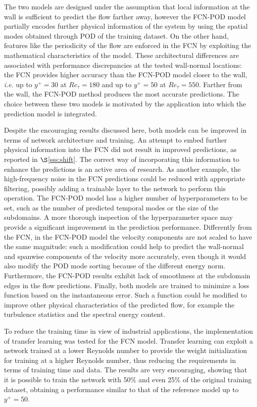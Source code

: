 The two models are designed under the assumption that local information at the wall is sufficient to predict the flow farther away, however the FCN-POD model partially encodes further physical information of the system by using the spatial modes obtained through POD of the training dataset.
On the other hand, features like the periodicity of the flow are enforced in the FCN by exploiting the mathematical characteristics of the model.
These architectural differences are associated with performance discrepancies at the tested wall-normal locations: the FCN provides higher accuracy than the FCN-POD model closer to the wall, {\it i.e.} up to $y^+=30$ at $Re_{\tau} = 180$ and up to $y^+=50$ at $Re_{\tau} = 550$.
Farther from the wall, the FCN-POD method produces the most accurate predictions.
The choice between these two models is motivated by the application into which the prediction model is integrated.

Despite the encouraging results discussed here, both models can be improved in terms of network architecture and training.
An attempt to embed further physical information into the FCN did not result in improved predictions, as reported in $\S$\ref{sss:shift}.
The correct way of incorporating this information to enhance the predictions is an active area of research. As another example, the high-frequency noise in the FCN predictions could be reduced with appropriate filtering, possibly adding a trainable layer to the network to perform this operation.
The FCN-POD model has a higher number of hyperparameters to be set, such as the number of predicted temporal modes or the size of the subdomains.
A more thorough inspection of the hyperparameter space may provide a significant improvement in the prediction performance.
Differently from the FCN, in the FCN-POD model the velocity components are not scaled to have the same magnitude: such a modification could help to predict the wall-normal and spanwise components of the velocity more accurately, even though it would also modify the POD mode sorting because of the different energy norm.
Furthermore, the FCN-POD results exhibit lack of smoothness at the subdomain edges in the flow predictions.
Finally, both models are trained to minimize a loss function based on the instantaneous error.
Such a function could be modified to improve other physical characteristics of the predicted flow, for example the turbulence statistics and the spectral energy content.

To reduce the training time in view of industrial applications, the implementation of transfer learning was tested for the FCN model.
Transfer learning can exploit a network trained at a lower Reynolds number to provide the weight initialization for training at a higher Reynolds number, thus reducing the requirements in terms of training time and data.
The results are very encouraging, showing that it is possible to train the network with 50\% and even 25\% of the original training dataset, obtaining a performance similar to that of the reference model up to $y^{+}=50$.

